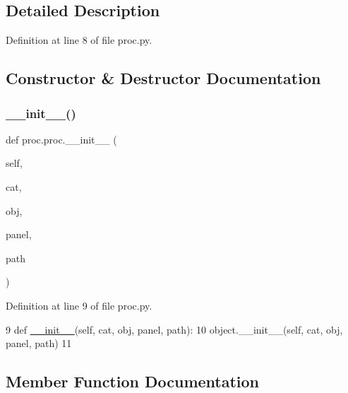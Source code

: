 \subsection{Detailed Description}


Definition at line 8 of file proc.\+py.



\subsection{Constructor \& Destructor Documentation}
\mbox{\label{classproc_1_1proc_ab5b9673d3e2e83cf26267f39055153f3}} 
\subsubsection{\texorpdfstring{\+\_\+\+\_\+init\+\_\+\+\_\+()}{\_\_init\_\_()}}
{\footnotesize\ttfamily def proc.\+proc.\+\_\+\+\_\+init\+\_\+\+\_\+ (\begin{DoxyParamCaption}\item[{}]{self,  }\item[{}]{cat,  }\item[{}]{obj,  }\item[{}]{panel,  }\item[{}]{path }\end{DoxyParamCaption})}



Definition at line 9 of file proc.\+py.


\begin{DoxyCode}
9     \textcolor{keyword}{def }\hyperlink{classwrapper_1_1ModuleDictWrapper_a9a7a794150502f51df687831583e13b9}{\_\_init\_\_}(self, cat, obj, panel, path):
10         object.\_\_init\_\_(self, cat, obj, panel, path)
11         
\end{DoxyCode}


\subsection{Member Function Documentation}
\mbox{\label{classproc_1_1proc_a7acf16dcc37aaf46cc783a382ae6bd82}} 
